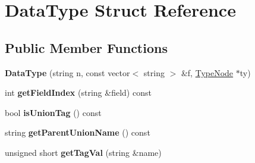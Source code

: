 \hypertarget{structDataType}{}\section{Data\+Type Struct Reference}
\label{structDataType}
\subsection*{Public Member Functions}
\begin{DoxyCompactItemize}
\item 
\mbox{\label{structDataType_a1bad1c37b2c2970eceb03de6c8e1a42a}} 
{\bfseries Data\+Type} (string n, const vector$<$ string $>$ \&f, \hyperlink{structTypeNode}{Type\+Node} $\ast$ty)
\item 
\mbox{\label{structDataType_a17be61dac2ef4a57e83a2c4f3ea08135}} 
int {\bfseries get\+Field\+Index} (string \&field) const
\item 
\mbox{\label{structDataType_a2df232326ecc98f773c79101f822e4f5}} 
bool {\bfseries is\+Union\+Tag} () const
\item 
\mbox{\label{structDataType_a49376335171335aa74f8d537cacefa0c}} 
string {\bfseries get\+Parent\+Union\+Name} () const
\item 
\mbox{\label{structDataType_a29a88e1c0987160f27ebdd80291dfb99}} 
unsigned short {\bfseries get\+Tag\+Val} (string \&name)
\end{DoxyCompactItemize}
